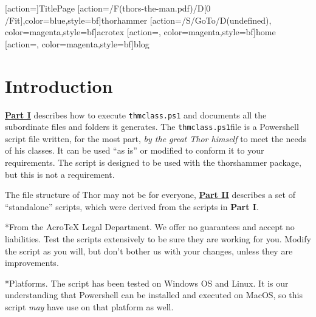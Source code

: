 \documentclass{article}
\makeatletter
\let\pkg\textsf
\let\app\textsf
\def\thescript{\texttt{thmclass.ps1}}
\renewcommand{\paragraph}
    {\@startsection{paragraph}{4}{0pt}{6pt}{-3pt}{\bfseries}}
\makeatother
\begin{document}
\maketitle

[action={}]{TitlePage}
[action={\GoToR/F(thors-the-man.pdf)/D[0 /Fit]},color=blue,style={bf}]{thorhammer}
[action={/S/GoTo/D(undefined)},%
  color=magenta,style={bf}]{acrotex}
[action={},%
  color=magenta,style={bf}]{home}
[action={},%
  color=magenta,style={bf}]{blog}


\tableofcontents
{}

\section{Introduction}

\textbf{\hyperref[PartI]{Part I}} describes how to execute {\thescript} and
documents all the subordinate files and folders it generates.
The \thescript\space file is a \app{Powershell} script file
written, for the most part, \emph{by the great Thor himself} to
meet the needs of his classes. It can be used ``as is'' or
modified to conform it to your requirements. The script is
designed to be used with the \pkg{thorshammer} package, but this
is not a requirement.

The file structure of Thor may not be for everyone, \textbf{\hyperref[PartII]{Part II}} describes a set
of ``standalone'' scripts, which were derived from the scripts in \textbf{Part I}.

\paragraph*{From the Acro\negthinspace\TeX{} Legal Department.}
We offer no guarantees and accept no liabilities. Test the
scripts extensively to be sure they are working for you. Modify the script
as you will, but don't bother us with your changes, unless they are improvements. %


\paragraph*{Platforms.} The script has been tested on
\textsf{Windows OS} and \app{Linux}. It is our understanding
that \app{Powershell} can be installed and executed on
\textsf{MacOS}, so this script \emph{may} have use on that
platform as well.
\end{document}
